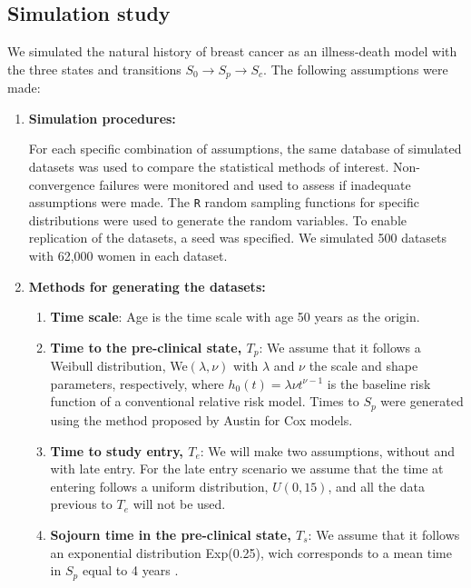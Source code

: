 \subsection{Simulation study}

We simulated the natural history of breast cancer as an illness-death model with the three states and transitions $S_0 \rightarrow S_p \rightarrow S_c$. The following assumptions were made:

\begin{enumerate}

\item \textbf{Simulation procedures:} 

For each specific combination of assumptions, the same database of simulated datasets was used to compare the statistical methods of interest. Non-convergence failures were monitored and used to assess if inadequate assumptions were made. The {\tt R} random sampling functions for specific distributions were used to generate the random variables. To enable replication of the datasets, a seed was specified. We simulated 500 datasets with 62,000 women in each dataset. 

\item \textbf{Methods for generating the datasets:} 

\begin{enumerate}

\item \textbf{Time scale}: Age is the time scale with age 50 years as the origin.

\item \textbf{Time to the pre-clinical state, $T_p$}: We assume that it follows a Weibull distribution, We$(\lambda,\nu)$ with $\lambda$ and $\nu$ the scale and shape parameters, respectively, where $h_0(t)=\lambda \nu t^{\nu-1}$ is the baseline risk function of a conventional relative risk model. Times to $S_p$ were generated using the method proposed by Austin \cite{Austin2012, Bender2005} for Cox models.

\item \textbf{Time to study entry, $T_e$}: We will make two assumptions, without and with late entry. For the late entry scenario we assume that the time at entering follows a uniform distribution, $U(0,15)$, and all the data previous to $T_e$ will not be used.

\item \textbf{Sojourn time in the pre-clinical state, $T_s$}: We assume that it follows an exponential distribution Exp(0.25), wich corresponds to a mean time in $S_p$ equal to 4 years \cite{Lee1998}. 


\end{enumerate}
\end{enumerate}
